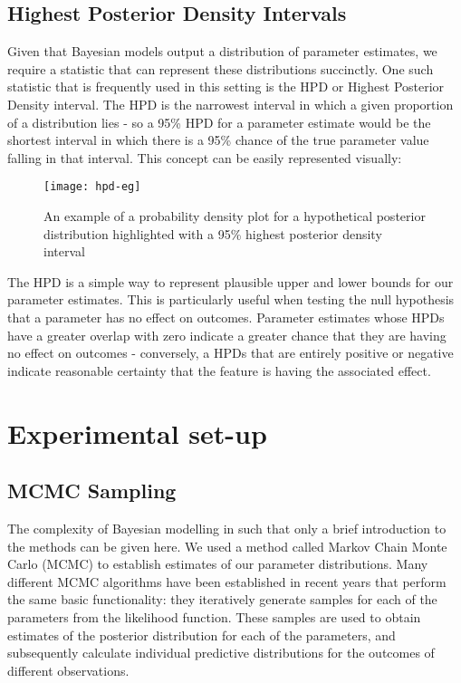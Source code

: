\subsection{Highest Posterior Density Intervals}\label{subsec:highest-posterior-density-intervals}

Given that Bayesian models output a distribution of parameter estimates, we require a statistic that can represent these distributions succinctly. One such statistic that is frequently used in this setting is the HPD or Highest Posterior Density interval. The HPD is the narrowest interval in which a given proportion of a distribution lies - so a 95\% HPD for a parameter estimate would be the shortest interval in which there is a 95\% chance of the true parameter value falling in that interval. This concept can be easily represented visually:

\begin{figure}[H]
    \centering
    \texttt{[image: hpd-eg]}
    \caption[Highest posterior density interval example]{An example of a probability density plot for a hypothetical posterior distribution highlighted with a 95\% highest posterior density interval}
    \label{fig:hpd-eg}
\end{figure}

The HPD is a simple way to represent plausible upper and lower bounds for our parameter estimates. This is particularly useful when testing the null hypothesis that a parameter has no effect on outcomes. Parameter estimates whose HPDs have a greater overlap with zero indicate a greater chance that they are having no effect on outcomes -  conversely, a HPDs that are entirely positive or negative indicate reasonable certainty that the feature is having the associated effect.

\section{Experimental set-up}\label{sec:experimental-set-up3}

 \subsection{MCMC Sampling}\label{subsec:mcmc-sampling}

The complexity of Bayesian modelling in such that only a brief introduction to the methods can be given here. We used a method called Markov Chain Monte Carlo (MCMC) to establish estimates of our parameter distributions. Many different MCMC algorithms have been established in recent years that perform the same basic functionality: they iteratively generate samples for each of the parameters from the likelihood function. These samples are used to obtain estimates of the posterior distribution for each of the parameters, and subsequently calculate individual predictive distributions for the outcomes of different observations.

